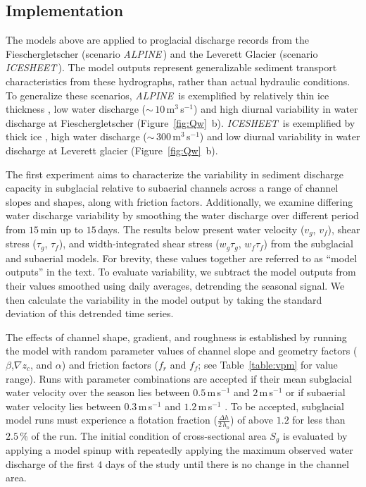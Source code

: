 \documentclass[esurf, manuscript]{copernicus}
\newcommand{\alpine}{\textit{ALPINE}\,}
\newcommand{\icesheet}{\textit{ICESHEET}\,}
\begin{document}
\FloatBarrier
\subsection{Implementation}
\label{sect:imp}

The models above are applied to proglacial discharge records from the Fieschergletscher (scenario \alpine{}) and the Leverett Glacier (scenario \icesheet{}).
The model outputs represent generalizable sediment transport characteristics from these hydrographs, rather than actual hydraulic conditions.
To generalize these scenarios, \alpine{}  is exemplified by relatively thin ice thickness \citep[$h_{ice}$= $225$\,\unit{m}][]{grab2021}, low water discharge ($\sim\,10$\,\unit{m}$^3$\,\unit{s}$^{-1}$) and high diurnal variability in water discharge at Fieschergletscher (Figure~\ref{fig:Qw}\, b).
\icesheet{}  is exemplified by   thick ice  \citep[$h_{ice}$= $700$\,\unit{m}; ][]{morlighem2017}, high water discharge ($\sim\,300$\,\unit{m}$^3$\,\unit{s}$^{-1}$)  and low diurnal variability in water discharge at Leverett glacier (Figure~\ref{fig:Qw}\, b).

The first experiment aims to characterize the variability in sediment discharge capacity in subglacial relative to subaerial channels across a range of channel slopes and shapes, along with friction factors.
Additionally, we examine differing water discharge variability by smoothing the water discharge over different period from $15$\,\unit{min} up to $15$\,\unit{days}.
The results below present water velocity ($v_g$, $v_f$), shear stress ($\tau_g$, $\tau_f$), and width-integrated shear stress ($w_g\tau_g$, $w_f\tau_f$) from the subglacial and subaerial models.
For brevity, these values together are referred to as ``model outputs'' in the text.
To evaluate variability, we subtract the model outputs from their values smoothed using daily averages,  detrending the seasonal signal.
We then calculate the variability in the model output by taking the standard deviation of this detrended time series.

The effects of channel shape, gradient, and roughness is established by running the model with random parameter values of channel slope and geometry factors ($\beta$,$\nabla z_c$, and $\alpha$) and friction factors ($f_r$ and $f_f$; see Table~\ref{table:vpm} for value range).
Runs with parameter combinations are accepted if their mean subglacial water velocity over the season lies between $0.5$\,\unit{m}\,\unit{s}$^{-1}$ and $2$\,\unit{m}\,\unit{s}$^{-1}$ or if subaerial water velocity lies between $0.3$\,\unit{m}\,\unit{s}$^{-1}$ and $1.2$\,\unit{m}\,\unit{s}$^{-1}$ \citep[e.g.][]{werder2010b,magnusson2012,chandler2013}.
To be accepted, subglacial model runs must experience a flotation fraction ($\frac{\Delta h}{2\,h_o}$) of above $1.2$ for less than $2.5$\,\% of the run.
The initial condition of cross-sectional area $S_g$ is evaluated by applying a model spinup with repeatedly applying the maximum observed water discharge of the first $4$ days of the study until there is no change in the channel area. 
\end{document}
